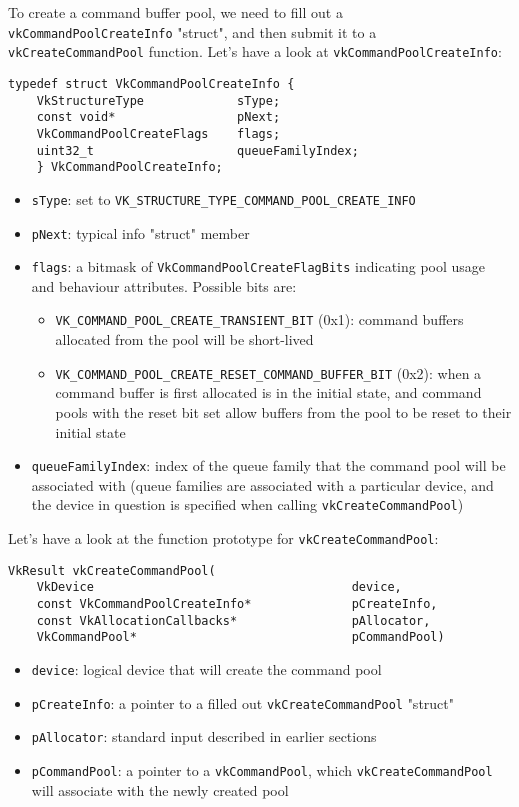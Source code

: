 \documentclass[12pt,letterpaper]{article}
\newcommand{\cil}[1]{\texttt{#1}}
\begin{document}
	To create a command buffer pool, we need to fill out a \cil{vkCommandPoolCreateInfo} "struct", and then submit it to a \cil{vkCreateCommandPool} function. Let's have a look at \cil{vkCommandPoolCreateInfo}:
	\begin{verbatim}
typedef struct VkCommandPoolCreateInfo {
	VkStructureType             sType;
	const void*                 pNext;
	VkCommandPoolCreateFlags    flags;
	uint32_t                    queueFamilyIndex;
	} VkCommandPoolCreateInfo;
	\end{verbatim}
		\begin{itemize}
			\item \cil{sType}: set to \cil{VK_STRUCTURE_TYPE_COMMAND_POOL_CREATE_INFO}
			
			\item \cil{pNext}: typical info "struct" member
			
			\item \cil{flags}: a bitmask of \cil{VkCommandPoolCreateFlagBits} indicating pool usage and behaviour attributes. Possible bits are:
				\begin{itemize}
					\item \cil{VK_COMMAND_POOL_CREATE_TRANSIENT_BIT} (0x1): command buffers allocated from the pool will be short-lived
					
					\item \cil{VK_COMMAND_POOL_CREATE_RESET_COMMAND_BUFFER_BIT} (0x2): when a command buffer is first allocated is in the initial state, and command pools with the reset bit set allow buffers from the pool to be reset to their initial state
				\end{itemize}
			
			\item \cil{queueFamilyIndex}: index of the queue family that the command pool will be associated with (queue families are associated with a particular device, and the device in question is specified when calling \cil{vkCreateCommandPool})
		\end{itemize}
	Let's have a look at the function prototype for \cil{vkCreateCommandPool}:
		\begin{verbatim}
VkResult vkCreateCommandPool(
	VkDevice                                    device,
	const VkCommandPoolCreateInfo*              pCreateInfo,
	const VkAllocationCallbacks*                pAllocator,
	VkCommandPool*                              pCommandPool)
		\end{verbatim}
		\begin{itemize}
			\item \cil{device}: logical device that will create the command pool
			
			\item \cil{pCreateInfo}: a pointer to a filled out \cil{vkCreateCommandPool} "struct"
			
			\item \cil{pAllocator}: standard input described in earlier sections
			
			\item \cil{pCommandPool}: a pointer to a \cil{vkCommandPool}, which \cil{vkCreateCommandPool} will associate with the newly created pool
		\end{itemize}
\end{document}
